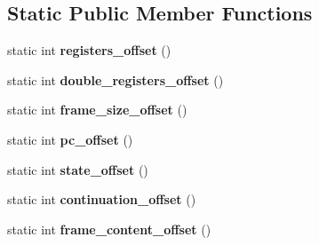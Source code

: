 \subsection*{Static Public Member Functions}
\begin{DoxyCompactItemize}
\item 
static int {\bfseries registers\+\_\+offset} ()\hypertarget{classv8_1_1internal_1_1_frame_description_aca4e7553fe5d6b6ee5cde8e13ec0f83f}{}\label{classv8_1_1internal_1_1_frame_description_aca4e7553fe5d6b6ee5cde8e13ec0f83f}

\item 
static int {\bfseries double\+\_\+registers\+\_\+offset} ()\hypertarget{classv8_1_1internal_1_1_frame_description_ad153c3c5f0a21b9bec32568e73d93d15}{}\label{classv8_1_1internal_1_1_frame_description_ad153c3c5f0a21b9bec32568e73d93d15}

\item 
static int {\bfseries frame\+\_\+size\+\_\+offset} ()\hypertarget{classv8_1_1internal_1_1_frame_description_a06dd3cd8ae0d2dfb9da60e5244ccce61}{}\label{classv8_1_1internal_1_1_frame_description_a06dd3cd8ae0d2dfb9da60e5244ccce61}

\item 
static int {\bfseries pc\+\_\+offset} ()\hypertarget{classv8_1_1internal_1_1_frame_description_ade843b58760cc40ad09c3eb3d0376281}{}\label{classv8_1_1internal_1_1_frame_description_ade843b58760cc40ad09c3eb3d0376281}

\item 
static int {\bfseries state\+\_\+offset} ()\hypertarget{classv8_1_1internal_1_1_frame_description_a885ed0fb1005c60ce5628571f605ef01}{}\label{classv8_1_1internal_1_1_frame_description_a885ed0fb1005c60ce5628571f605ef01}

\item 
static int {\bfseries continuation\+\_\+offset} ()\hypertarget{classv8_1_1internal_1_1_frame_description_a555ca7a3c4118a4bdff2936a7048754e}{}\label{classv8_1_1internal_1_1_frame_description_a555ca7a3c4118a4bdff2936a7048754e}

\item 
static int {\bfseries frame\+\_\+content\+\_\+offset} ()\hypertarget{classv8_1_1internal_1_1_frame_description_a6758b613b805fc441d2def08e7a5eabe}{}\label{classv8_1_1internal_1_1_frame_description_a6758b613b805fc441d2def08e7a5eabe}

\end{DoxyCompactItemize}
